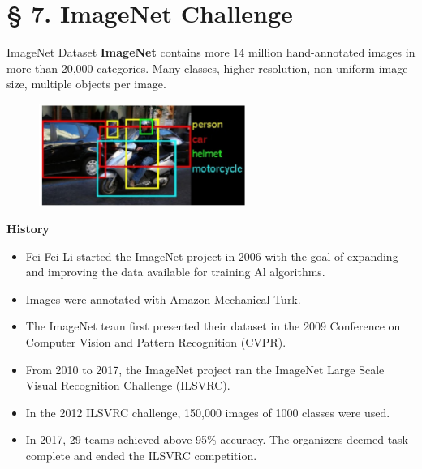 \section{§ 7. ImageNet Challenge}

\begin{frame}[allowframebreaks]

\begin{mydefinitionblock}{7.1}{ImageNet Dataset}
    \textbf{ImageNet} contains more 14 million hand-annotated images in more than 20,000 categories.
    Many classes, higher resolution, non-uniform image size, multiple objects per image.

    \begin{figure}[H]
        \centering
        \includegraphics[width=0.6\textwidth]{.././assets/7.1.jpg}
    \end{figure}

    \par\noindent\textcolor{gray}{\hdashrule{\textwidth}{0.4pt}{1pt 2pt}}

    \textbf{History}

    \begin{itemize}
        \item Fei-Fei Li started the ImageNet project in 2006 with the goal of expanding and improving the data available for training Al algorithms.
        \item Images were annotated with Amazon Mechanical Turk.
        \item The ImageNet team first presented their dataset in the 2009 Conference on Computer Vision and Pattern Recognition (CVPR).
        \item From 2010 to 2017, the ImageNet project ran the ImageNet Large Scale Visual Recognition Challenge (ILSVRC).
        \item In the 2012 ILSVRC challenge, 150,000 images of 1000 classes were used.
        \item In 2017, 29 teams achieved above 95\% accuracy. The organizers deemed task complete and ended the ILSVRC competition.
    \end{itemize}


\end{mydefinitionblock}
\end{frame}
